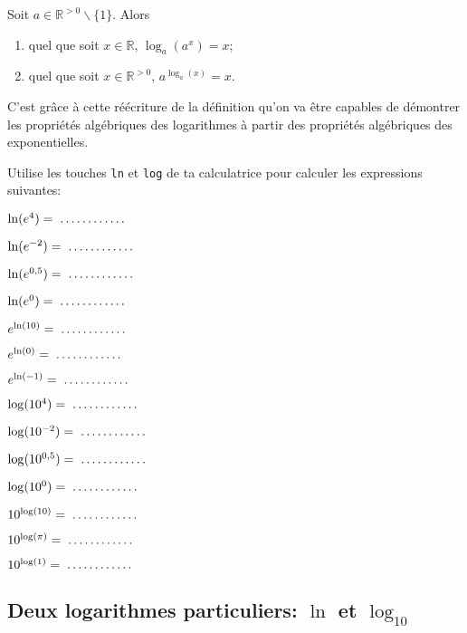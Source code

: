 \documentclass[a4paper,12pt,singlepage]{report}
\newcommand{\IR}{\mathbb{R}}
\newcommand{\jdot}[1]{ \makebox[#1]{\dotfill}}
\begin{document}
\begin{propriete}
Soit \(a\in\IR^{>0}\backslash\{1\}\). Alors
\begin{enumerate}
\item quel que soit \(x\in\IR\), \(\log_a(a^x)=x\);
\item quel que soit \(x\in\IR^{>0}\), \(a^{\log_a(x)}=x\).
\end{enumerate}
\end{propriete}

C'est grâce à cette réécriture de la définition qu'on va être capables de
démontrer les propriétés algébriques des logarithmes à partir des propriétés
algébriques des exponentielles.

\begin{exemple}
Utilise les touches \texttt{ln} et \texttt{log} de ta calculatrice pour calculer
les expressions suivantes:

\par \setlength{\columnseprule}{0 pt}
          \begin{minipage}[t]{\linewidth}
          \begin{multicols}{2}

\(\ln(e^4)=\jdot{2cm}\)

\(\ln(e^{-2})=\jdot{2cm}\)

\(\ln(e^{0,5})=\jdot{2cm}\)

\(\ln(e^{0})=\jdot{2cm}\)

\(e^{\ln(10)}=\jdot{2cm}\)

\(e^{\ln(0)}=\jdot{2cm}\)

\(e^{\ln(-1)}=\jdot{2cm}\)

\(\log(10^4)=\jdot{2cm}\)

\(\log(10^{-2})=\jdot{2cm}\)

\(\log(10^{0,5})=\jdot{2cm}\)

\(\log(10^{0})=\jdot{2cm}\)

\(10^{\log(10)}=\jdot{2cm}\)

\(10^{\log(\pi)}=\jdot{2cm}\)

\(10^{\log(1)}=\jdot{2cm}\)


\end{multicols}\end{minipage}
\end{exemple}
\subsection{Deux logarithmes particuliers: \(\ln\) et \(\log_{10}\)}
\label{sec:org1b21906}
\end{document}
